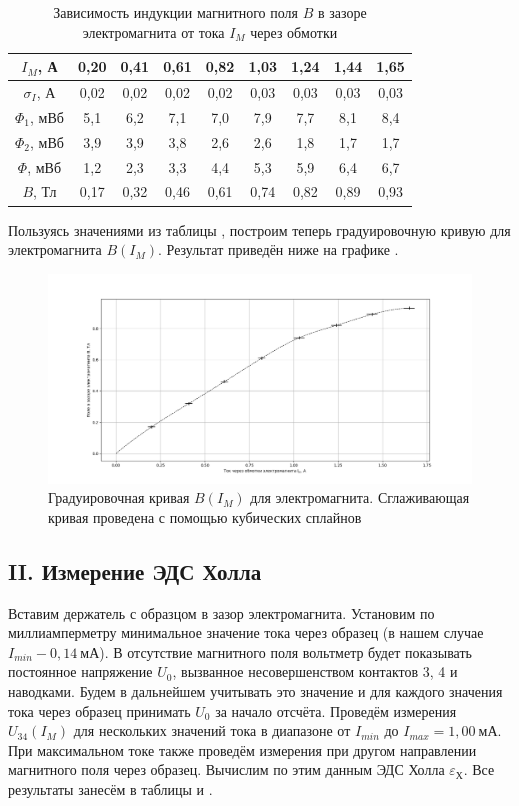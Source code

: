 \documentclass[a4paper,10pt]{article}
\begin{document}
\begin{table}[h]
	\centering
	\caption{Зависимость индукции магнитного поля $B$ в зазоре электромагнита от тока $I_M$ через обмотки} \label{kal}
	\begin{tabular}{|c|c|c|c|c|c|c|c|c|}
		\hline
		$I_M$, А & 0,20 & 0,41 & 0,61 & 0,82 & 1,03 & 1,24 & 1,44 & 1,65 \\ \hline
		$\sigma_I$, А & 0,02 & 0,02 & 0,02 & 0,02 & 0,03 & 0,03 & 0,03 & 0,03 \\ \hline
		$\Phi_1$, мВб & 5,1 & 6,2 & 7,1 & 7,0 & 7,9 & 7,7 & 8,1 & 8,4 \\ \hline
		$\Phi_2$, мВб & 3,9 & 3,9 & 3,8 & 2,6 & 2,6 & 1,8 & 1,7 & 1,7 \\ \hline
		$\Phi$, мВб & 1,2 & 2,3 & 3,3 & 4,4 & 5,3 & 5,9 & 6,4 & 6,7 \\ \hline
		$B$, Тл & 0,17 & 0,32 & 0,46 & 0,61 & 0,74 & 0,82 & 0,89 & 0,93 \\ \hline
	\end{tabular}
\end{table}

Пользуясь значениями из таблицы , построим теперь градуировочную кривую для электромагнита $B(I_M)$. Результат приведён ниже на графике .

\begin{figure}[h]
	\centering
	\includegraphics[scale = 0.33]{kkal}
	\caption{Градуировочная кривая $B(I_M)$ для электромагнита. Сглаживающая кривая проведена с помощью кубических сплайнов} \label{kkal}
\end{figure} 

\subsection*{II. Измерение ЭДС Холла}

Вставим держатель с образцом в зазор электромагнита. Установим по миллиамперметру минимальное значение тока через образец (в нашем случае $I_{min}-0,14~\text{мА}$). В отсутствие магнитного поля вольтметр будет показывать постоянное напряжение $U_0$, вызванное несовершенством контактов 3, 4 и наводками. Будем в дальнейшем учитывать это значение и для каждого значения тока через образец принимать $U_0$ за начало отсчёта. Проведём измерения $U_{34}(I_M)$ для нескольких значений тока в диапазоне от $I_{min}$ до $I_{max}=1,00~\text{мА}$. При максимальном токе также проведём измерения при другом направлении магнитного поля через образец. Вычислим по этим данным ЭДС Холла $\varepsilon_{\text{Х}}$. Все результаты занесём в таблицы  и .
\end{document}
